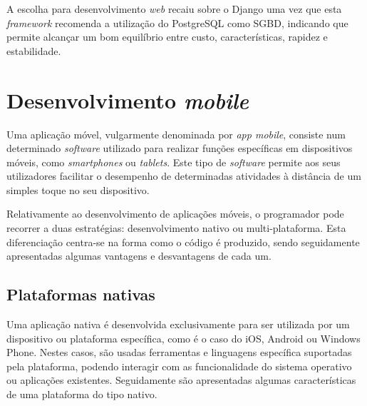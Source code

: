 A escolha para desenvolvimento \textit{web} recaiu sobre o Django uma vez que esta \textit{framework} recomenda a utilização do PostgreSQL como \ac{SGBD}, indicando que permite alcançar um bom equilíbrio entre custo, características, rapidez e estabilidade\cite{Holovaty2009}. 













\newpage
\section{Desenvolvimento \textit{mobile}}


Uma aplicação móvel, vulgarmente denominada por \textit{app mobile}, consiste num determinado \textit{software} utilizado para realizar funções específicas em dispositivos móveis, como \textit{smartphones} ou \textit{tablets}. Este tipo de \textit{software} permite aos seus utilizadores facilitar o desempenho de determinadas atividades à distância de um simples toque no seu dispositivo. 

Relativamente ao desenvolvimento de aplicações móveis, o programador pode recorrer a duas estratégias: desenvolvimento nativo ou multi-plataforma. Esta diferenciação centra-se na forma como o código é produzido, sendo seguidamente apresentadas algumas  vantagens e desvantagens de cada um. 





\subsection{Plataformas nativas}

Uma aplicação nativa é desenvolvida exclusivamente para ser utilizada por um dispositivo ou plataforma específica, como é o caso do iOS, Android ou Windows Phone. Nestes casos, são usadas ferramentas e linguagens específica suportadas pela plataforma, podendo interagir com as funcionalidade do sistema operativo ou aplicações existentes. Seguidamente são apresentadas algumas características de uma plataforma do tipo nativo\cite{Ibm2012a}. 








